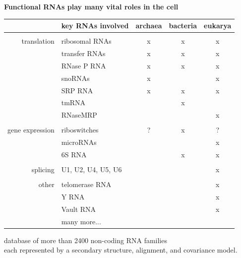 \documentclass[landscape]{slides}
\begin{document}
\begin{slide}
\begin{center}
\textbf{Functional RNAs play many vital roles in the cell}
\end{center}
\medskip

\small
\begin{center}
\begin{tabular}{r|l|ccc}
 & key RNAs involved & archaea & bacteria & eukarya \\ \hline
 & \\ 
translation & ribosomal RNAs & x & x & x \\
            & transfer RNAs  & x & x & x \\
            & RNase P RNA    & x & x & x \\
            & snoRNAs        & x &   & x \\ 
            & SRP RNA        & x & x & x \\ 
            & tmRNA          &   & x &   \\ 
            & RNaseMRP       &   &   & x \\ 
            &  \\ 
gene expression & riboswitches & ? & x & ? \\
                & microRNAs &  & & x \\
                & 6S RNA & & x & x\\ 
                & \\ 
splicing        & U1, U2, U4, U5, U6 & & & x \\ 
                & \\
other           & telomerase RNA & & & x \\ 
                & Y RNA          & & & x \\
                & Vault RNA      & & & x \\
                & many more... & & & \\ 
\end{tabular}



database of more than 2400 non-coding RNA families \\ each represented by a
secondary structure, alignment, and covariance model.
\end{center}

\vfill
\end{slide}
\end{document}
